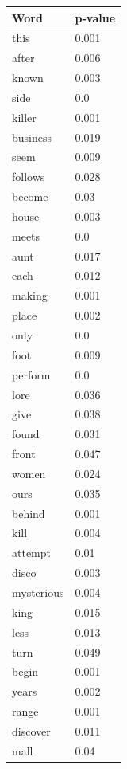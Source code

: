 \documentclass[12pt, oneside]{article}   	%
\begin{document}
\begin{table}
\begin{tabular}[t]{l|l}
\textbf{Word}        & \textbf{p-value} \\ \hline
this        & 0.001    \\
after       & 0.006    \\
known       & 0.003    \\
side        & 0.0      \\
killer      & 0.001    \\
business    & 0.019    \\
seem        & 0.009    \\
follows     & 0.028    \\
become      & 0.03     \\
house       & 0.003    \\
meets       & 0.0      \\
aunt        & 0.017    \\
each        & 0.012    \\
making      & 0.001    \\
place       & 0.002    \\
only        & 0.0      \\
foot        & 0.009    \\
perform     & 0.0      \\
lore        & 0.036    \\
give        & 0.038    \\
found       & 0.031    \\
front       & 0.047    \\
women       & 0.024    \\
ours        & 0.035    \\
behind      & 0.001    \\
kill        & 0.004    \\
attempt     & 0.01     \\
disco       & 0.003    \\
mysterious  & 0.004    \\
king        & 0.015    \\
less        & 0.013    \\
turn        & 0.049    \\
begin       & 0.001    \\
years       & 0.002    \\
range       & 0.001    \\
discover    & 0.011    \\
mall        & 0.04     \\

\end{tabular}
\end{table}
\end{document}
